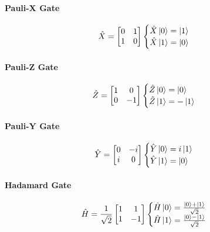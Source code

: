 \documentclass[reprint, amsmath,amssymb, aps]{revtex4-2}
\begin{document}
            \paragraph{Pauli-X Gate}
                \begin{align*}
                    \hat{X} &= \begin{bmatrix}0 & 1 \\1 & 0\end{bmatrix} \begin{cases}\hat{X}\ket{0} = \ket{1} \\ \hat{X}\ket{1} = \ket{0}\end{cases}
                \end{align*}
            \paragraph{Pauli-Z Gate}
                \begin{align*}
                    \hat{Z} &= \begin{bmatrix}1 & 0 \\0 & -1\end{bmatrix}\begin{cases}\hat{Z}\ket{0} = \ket{0} \\ \hat{Z}\ket{1} = -\ket{1}\end{cases}
                \end{align*}
    
            \paragraph{Pauli-Y Gate}
                \begin{align*}
                    \hat{Y} &= \begin{bmatrix}0 & -i \\i & 0\end{bmatrix}\begin{cases}\hat{Y}\ket{0} = i\ket{1} \\ \hat{Y}\ket{1} = \ket{0}\end{cases}
                \end{align*}
    
            \paragraph{Hadamard Gate}
                \begin{align*}
                    \hat{H} &= \frac{1}{\sqrt{2}}\begin{bmatrix}1 & 1 \\1 & -1\end{bmatrix}\begin{cases}\hat{H}\ket{0} =\frac{\ket{0}+\ket{1}}{\sqrt{2}} \\ \hat{H}\ket{1} = \frac{\ket{0}-\ket{1}}{\sqrt{2}}\end{cases}
                \end{align*}
    
\end{document}
